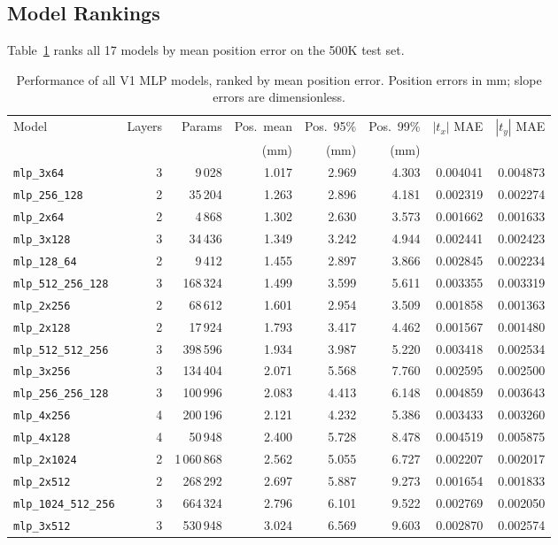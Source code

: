 \documentclass[11pt,a4paper]{article}
\newcommand{\tx}{t_x}
\newcommand{\ty}{t_y}
\begin{document}
\subsection{Model Rankings}
\label{sec:rankings}

Table~\ref{tab:all_models} ranks all 17 models by mean position error on the 500K test set.

\begin{table}[H]
\centering
\caption{Performance of all V1 MLP models, ranked by mean position error. Position errors in mm; slope errors are dimensionless.}
\label{tab:all_models}
\begin{tabular}{@{}l r r r r r r r@{}}
\toprule
Model & Layers & Params & Pos.\ mean & Pos.\ 95\% & Pos.\ 99\% & $|\tx|$ MAE & $|\ty|$ MAE \\
      &        &        & (mm)       & (mm)       & (mm)       &               &               \\
\midrule
\texttt{mlp\_3x64}          & 3 &   9\,028 & 1.017 & 2.969 &  4.303 & 0.004041 & 0.004873 \\
\texttt{mlp\_256\_128}      & 2 &  35\,204 & 1.263 & 2.896 &  4.181 & 0.002319 & 0.002274 \\
\texttt{mlp\_2x64}          & 2 &   4\,868 & 1.302 & 2.630 &  3.573 & 0.001662 & 0.001633 \\
\texttt{mlp\_3x128}         & 3 &  34\,436 & 1.349 & 3.242 &  4.944 & 0.002441 & 0.002423 \\
\texttt{mlp\_128\_64}       & 2 &   9\,412 & 1.455 & 2.897 &  3.866 & 0.002845 & 0.002234 \\
\texttt{mlp\_512\_256\_128} & 3 & 168\,324 & 1.499 & 3.599 &  5.611 & 0.003355 & 0.003319 \\
\texttt{mlp\_2x256}         & 2 &  68\,612 & 1.601 & 2.954 &  3.509 & 0.001858 & 0.001363 \\
\texttt{mlp\_2x128}         & 2 &  17\,924 & 1.793 & 3.417 &  4.462 & 0.001567 & 0.001480 \\
\texttt{mlp\_512\_512\_256} & 3 & 398\,596 & 1.934 & 3.987 &  5.220 & 0.003418 & 0.002534 \\
\texttt{mlp\_3x256}         & 3 & 134\,404 & 2.071 & 5.568 &  7.760 & 0.002595 & 0.002500 \\
\texttt{mlp\_256\_256\_128} & 3 & 100\,996 & 2.083 & 4.413 &  6.148 & 0.004859 & 0.003643 \\
\texttt{mlp\_4x256}         & 4 & 200\,196 & 2.121 & 4.232 &  5.386 & 0.003433 & 0.003260 \\
\texttt{mlp\_4x128}         & 4 &  50\,948 & 2.400 & 5.728 &  8.478 & 0.004519 & 0.005875 \\
\texttt{mlp\_2x1024}        & 2 & 1\,060\,868 & 2.562 & 5.055 & 6.727 & 0.002207 & 0.002017 \\
\texttt{mlp\_2x512}         & 2 & 268\,292 & 2.697 & 5.887 &  9.273 & 0.001654 & 0.001833 \\
\texttt{mlp\_1024\_512\_256}& 3 & 664\,324 & 2.796 & 6.101 &  9.522 & 0.002769 & 0.002050 \\
\texttt{mlp\_3x512}         & 3 & 530\,948 & 3.024 & 6.569 &  9.603 & 0.002870 & 0.002574 \\
\bottomrule
\end{tabular}
\end{table}
\end{document}
